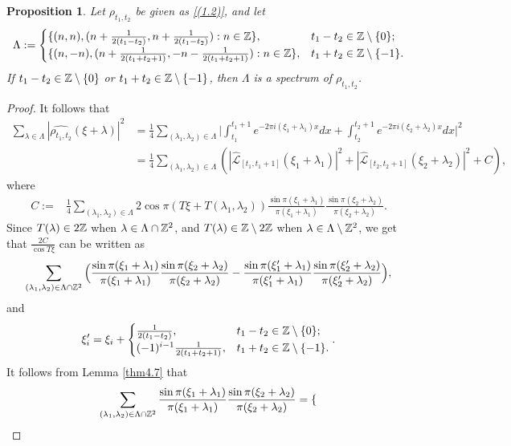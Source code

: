 \documentclass[12pt,psfig,reqno]{amsart}
\numberwithin{equation}{section}
\theoremstyle{plain}
\newtheorem{prop}[thm]{Proposition}
\begin{document}
\begin{prop}
	Let $\rho_{t_1,t_2}$ be given as \eqref{(1.2)}, and let $$
	\Lambda:=\begin{cases}
\{(n,n),(n+\frac{1}{2(t_1-t_2)},n+\frac{1}{2(t_1-t_2)}):n\in\Bbb Z\}, & t_1-t_2\in\Bbb Z\setminus\{0\};
\\
\{(n,-n),(n+\frac{1}{2(t_1+t_2+1)},-n-\frac{1}{2(t_1+t_2+1)}):n\in\Bbb Z\}, & t_1+t_2\in\Bbb Z\setminus\{-1\}.
	\end{cases}
	$$
	If $t_1-t_2\in\Bbb Z\setminus\{0\}$ or $t_1+t_2\in\Bbb Z\setminus\{-1\}$, then $\Lambda$ is a spectrum of $\rho_{t_1,t_2}$. 
\end{prop}
\begin{proof}
	It follows that 
	\begin{align*}
\sum_{\lambda\in\Lambda}|\widehat{\rho_{t_1,t_2}}(\xi+\lambda)|^2&=	\frac14\sum_{(\lambda_1,\lambda_2)\in\Lambda}\Big|
		\int_{t_1}^{t_1+1}e^{-2\pi i(\xi_1+\lambda_1)x}dx+		\int_{t_2}^{t_2+1}e^{-2\pi i(\xi_2+\lambda_2)x}dx\Big|^2
		\\
		&=\frac14\sum_{(\lambda_1,\lambda_2)\in\Lambda}(|\widehat{\mathcal{L}}_{[t_1,t_1+1]}(\xi_1+\lambda_1)|^2+|\widehat{\mathcal{L}}_{[t_2,t_2+1]}(\xi_2+\lambda_2)|^2+C),
	\end{align*}
where 
	\begin{align*}
		C:=&\frac14\sum_{(\lambda_1,\lambda_2)\in\Lambda}2\cos\pi(T\xi+T(\lambda_1,\lambda_2))\frac{\sin\pi(\xi_1+\lambda_1)}{\pi(\xi_1+\lambda_1)}\frac{\sin\pi(\xi_2+\lambda_2)}{\pi(\xi_2+\lambda_2)}.
	\end{align*}
	Since $T(\lambda)\in2\Bbb Z$ when $\lambda\in\Lambda\cap\Bbb Z^2$, and $T(\lambda)\in\Bbb Z\setminus2\Bbb Z$ when $\lambda\in\Lambda\setminus\Bbb Z^2$, we get that $\frac{2C}{\cos T\xi}$ can be written as  
		\begin{align*}
	\sum_{(\lambda_1,\lambda_2)\in\Lambda\cap\Bbb Z^2}\Big(\frac{\sin\pi(\xi_1+\lambda_1)}{\pi(\xi_1+\lambda_1)}\frac{\sin\pi(\xi_2+\lambda_2)}{\pi(\xi_2+\lambda_2)}-\frac{\sin\pi(\xi_1'+\lambda_1)}{\pi(\xi_1'+\lambda_1)}\frac{\sin\pi(\xi_2'+\lambda_2)}{\pi(\xi_2'+\lambda_2)}\Big), 
	\end{align*}
and $$\xi_i'=\xi_i+\begin{cases}
\frac{1}{2(t_1-t_2)}, & t_1-t_2\in\Bbb Z\setminus\{0\};
\\
(-1)^{i-1
}\frac{1}{2(t_1+t_2+1)}, & t_1+t_2\in\Bbb Z\setminus\{-1\}.
\end{cases}. $$
It follows from Lemma \ref{thm4.7} that 
$$
	\sum_{(\lambda_1,\lambda_2)\in\Lambda\cap\Bbb Z^2}\frac{\sin\pi(\xi_1+\lambda_1)}{\pi(\xi_1+\lambda_1)}\frac{\sin\pi(\xi_2+\lambda_2)}{\pi(\xi_2+\lambda_2)}=\begin{cases}

\end{cases}$$
\end{proof}
\end{document}
